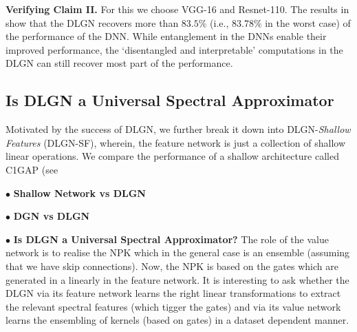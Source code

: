 


\textbf{Verifying Claim II.} For this we choose VGG-16 and Resnet-110. The results in  show that the DLGN recovers more than $83.5\%$ (i.e., $83.78\%$ in the worst case) of the performance of the DNN. %
While entanglement in the DNNs enable their improved performance,  the `disentangled and interpretable'  computations in the DLGN can still recover most part of the performance. %

\subsection{Is DLGN a Universal Spectral Approximator}
Motivated by the success of DLGN, we further break it down into DLGN-\emph{Shallow Features} (DLGN-SF), wherein, the feature network is just a collection of shallow linear operations. We compare the performance of a shallow architecture called C1GAP (see 




\begin{figure}
\centering
\resizebox{1.0\columnwidth}{!}{

}
\end{figure}

$\bullet$ \textbf{Shallow Network vs DLGN}

$\bullet$ \textbf{DGN vs DLGN}

$\bullet$ \textbf{Is DLGN a Universal Spectral Approximator?} The role of the value network is to realise the NPK which in the general case is an ensemble (assuming that we have skip connections). Now, the NPK is based on the gates which are generated in a linearly in the feature network. It is interesting to ask whether the DLGN via its feature network learns the right linear transformations to extract the relevant spectral features (which tigger the gates) and  via its value network learns  the ensembling of kernels (based on gates) in a dataset dependent manner.

